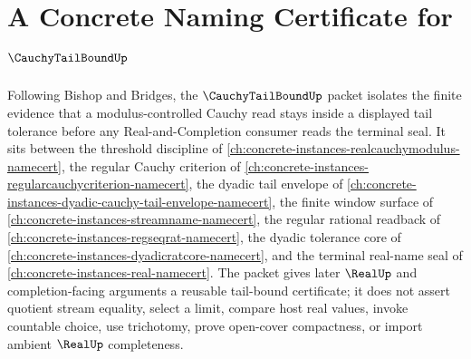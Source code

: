 \chapter{A Concrete Naming Certificate for $\CauchyTailBoundUp$}
\label{ch:concrete-instances-cauchy-tail-bound-namecert}

Following Bishop and Bridges, the $\CauchyTailBoundUp$ packet isolates the finite evidence that a modulus-controlled Cauchy read stays inside a displayed tail tolerance before any Real-and-Completion consumer reads the terminal seal. It sits between the threshold discipline of \autoref{ch:concrete-instances-realcauchymodulus-namecert}, the regular Cauchy criterion of \autoref{ch:concrete-instances-regularcauchycriterion-namecert}, the dyadic tail envelope of \autoref{ch:concrete-instances-dyadic-cauchy-tail-envelope-namecert}, the finite window surface of \autoref{ch:concrete-instances-streamname-namecert}, the regular rational readback of \autoref{ch:concrete-instances-regseqrat-namecert}, the dyadic tolerance core of \autoref{ch:concrete-instances-dyadicratcore-namecert}, and the terminal real-name seal of \autoref{ch:concrete-instances-real-namecert}. The packet gives later $\RealUp$ and completion-facing arguments a reusable tail-bound certificate; it does not assert quotient stream equality, select a limit, compare host real values, invoke countable choice, use trichotomy, prove open-cover compactness, or import ambient $\RealUp$ completeness.

